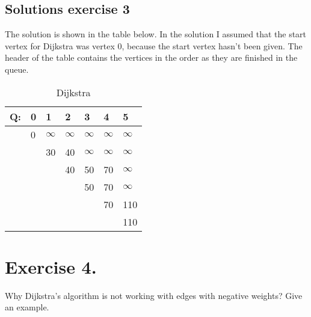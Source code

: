 \documentclass{article}
\begin{document}
\subsection*{Solutions exercise 3}
The solution is shown in the table below. In the solution I assumed that the start vertex for Dijkstra was vertex 0, because the start vertex hasn't been given. The header of the table contains the vertices in the order as they are finished in the queue.
\begin{table}[h]
\centering
\caption{Dijkstra}
\label{my-label}
\begin{tabular}{lllllll}
\hline
Q: & 0 & 1        & 2        & 3        & 4        & 5        \\ \hline
& 0 & $\infty$ & $\infty$ & $\infty$ & $\infty$ & $\infty$ \\
&   & 30       & 40       & $\infty$ & $\infty$ & $\infty$ \\
&   &          & 40       & 50       & 70       & $\infty$ \\
&   &          &          & 50       & 70       & $\infty$ \\
&   &          &          &          & 70       & 110      \\
&   &          &          &          &          & 110
\end{tabular}
\end{table}

\newpage
\section*{Exercise 4.}
Why Dijkstra's algorithm is not working with edges with negative weights? Give an example.
\end{document}
